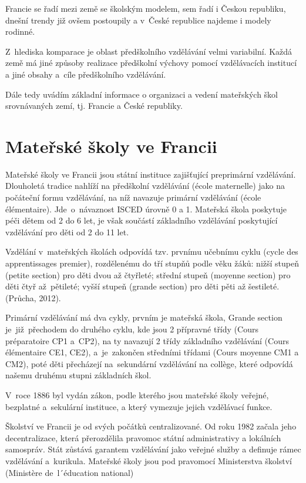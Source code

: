 		Francie se řadí mezi země se školským modelem, \citet{Prucha99} sem řadí i Českou republiku, dnešní trendy již ovšem postoupily a v České republice najdeme i modely rodinné.

		Z hlediska komparace je oblast předškolního vzdělávání velmi variabilní. Každá země má jiné způsoby realizace předškolní výchovy pomocí vzdělávacích institucí a jiné obsahy a cíle předškolního vzdělávání. 

		Dále tedy uvádím základní informace o organizaci a vedení mateřských škol srovnávaných zemí, tj. Francie a České republiky.

	\section{Mateřské školy ve Francii}
		Mateřské školy ve Francii jsou státní instituce zajišťující preprimární vzdělávání. Dlouholetá tradice nahlíží na předškolní vzdělávání (école maternelle) jako na počáteční formu vzdělávání, na níž navazuje primární vzdělávání (école élémentaire). Jde o návaznost ISCED  úrovně 0 a 1. Mateřská škola poskytuje péči dětem od 2 do 6 let, je však součástí základního vzdělávání poskytující vzdělávání pro děti od 2 do 11 let.

		Vzdělání v mateřských školách odpovídá tzv. prvnímu učebnímu cyklu (cycle des apprentissages premier), rozdělenému do tří stupňů podle věku žáků: nižší stupeň (petite section) pro děti dvou až čtyřleté; střední stupeň (moyenne section) pro děti čtyř až pětileté; vyšší stupeň (grande section) pro děti pěti až šestileté.
		(Průcha, 2012). 

		Primární vzdělávání má dva cykly, prvním je mateřská škola, Grande section je již přechodem do druhého cyklu, kde jsou 2 přípravné třídy (Cours préparatoire CP1 a CP2), na ty navazují 2 třídy základního vzdělávání (Cours élémentaire CE1, CE2), a je zakončen středními třídami (Cours moyenne CM1 a CM2), poté děti přecházejí na sekundární vzdělávání na collège, které odpovídá našemu druhému stupni základních škol. 

		V roce 1886 byl vydán zákon, podle kterého jsou mateřské školy veřejné, bezplatné a sekulární instituce, a který vymezuje jejich vzdělávací funkce. 

		Školství ve Francii je od svých počátků centralizované. Od roku 1982 začala jeho decentralizace, která přerozdělila pravomoc státní administrativy a lokálních samospráv. Stát zůstává garantem vzdělávání jako veřejné služby a definuje rámec vzdělávání a kurikula. Mateřské školy jsou pod pravomocí Ministerstva školství (Ministère de l´éducation national)

